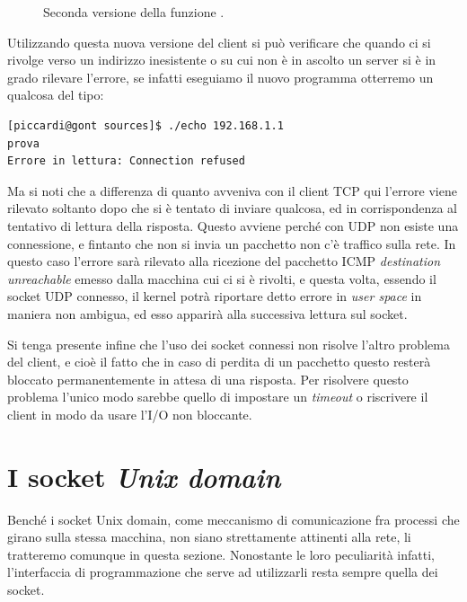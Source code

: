 \begin{figure}[!htbp] 
  \footnotesize \centering
  \begin{minipage}[c]{\codesamplewidth}
  \end{minipage}
  \normalsize
  \caption{Seconda versione della funzione .}
  \label{fig:UDP_echo_conn_echo_client}
\end{figure}

Utilizzando questa nuova versione del client si può verificare che quando ci
si rivolge verso un indirizzo inesistente o su cui non è in ascolto un server
si è in grado rilevare l'errore, se infatti eseguiamo il nuovo programma
otterremo un qualcosa del tipo:
\begin{verbatim}
[piccardi@gont sources]$ ./echo 192.168.1.1
prova
Errore in lettura: Connection refused
\end{verbatim}%

Ma si noti che a differenza di quanto avveniva con il client TCP qui l'errore
viene rilevato soltanto dopo che si è tentato di inviare qualcosa, ed in
corrispondenza al tentativo di lettura della risposta. Questo avviene perché
con UDP non esiste una connessione, e fintanto che non si invia un pacchetto
non c'è traffico sulla rete. In questo caso l'errore sarà rilevato alla
ricezione del pacchetto ICMP \textit{destination unreachable} emesso dalla
macchina cui ci si è rivolti, e questa volta, essendo il socket UDP connesso,
il kernel potrà riportare detto errore in \textit{user space} in maniera non
ambigua, ed esso apparirà alla successiva lettura sul socket.

Si tenga presente infine che l'uso dei socket connessi non risolve l'altro
problema del client, e cioè il fatto che in caso di perdita di un pacchetto
questo resterà bloccato permanentemente in attesa di una risposta. Per
risolvere questo problema l'unico modo sarebbe quello di impostare un
\textit{timeout} o riscrivere il client in modo da usare l'I/O non bloccante.





\section{I socket \textit{Unix domain}}
\label{sec:unix_socket}

Benché i socket Unix domain, come meccanismo di comunicazione fra processi che
girano sulla stessa macchina, non siano strettamente attinenti alla rete, li
tratteremo comunque in questa sezione. Nonostante le loro peculiarità infatti,
l'interfaccia di programmazione che serve ad utilizzarli resta sempre quella
dei socket.



